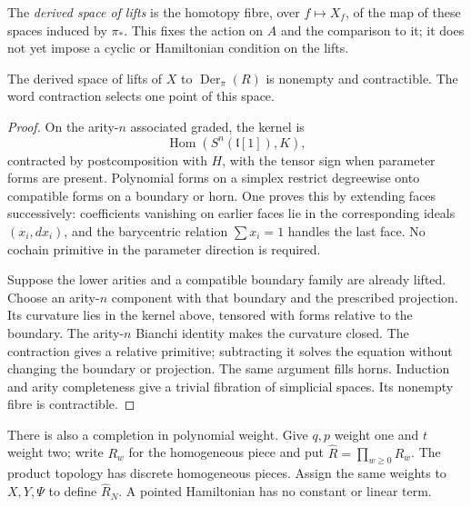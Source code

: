 The \emph{derived space of lifts} is the homotopy fibre, over
$f\mapsto X_f$, of the map of these spaces induced by $\pi_*$.
This fixes the action on $A$ and the comparison to it; it does
not yet impose a cyclic or Hamiltonian condition on the lifts.

\begin{proposition}\label{prop:vol2-hamiltonian-lift-space}
The derived space of lifts of $X$ to
$\operatorname{Der}_\pi(R)$ is nonempty and contractible.
The word contraction selects one point of this space.
\end{proposition}
\begin{proof}
On the arity-$n$ associated graded, the kernel is
\[
 \operatorname{Hom}(S^n(\mathfrak l[1]),K),
\]
contracted by postcomposition with $H$, with the tensor sign
when parameter forms are present. Polynomial forms on a simplex
restrict degreewise onto compatible forms on a boundary or horn.
One proves this by extending faces successively: coefficients
vanishing on earlier faces lie in the corresponding ideals
$(x_i,dx_i)$, and the barycentric relation $\sum x_i=1$
handles the last face. No cochain primitive in the parameter
direction is required.

Suppose the lower arities and a compatible boundary family are
already lifted. Choose an arity-$n$ component with that boundary
and the prescribed projection. Its curvature lies in the kernel
above, tensored with forms relative to the boundary. The
arity-$n$ Bianchi identity makes the curvature closed. The
contraction gives a relative primitive; subtracting it solves
the equation without changing the boundary or projection.
The same argument fills horns. Induction and arity completeness
give a trivial fibration of simplicial spaces. Its nonempty
fibre is contractible.
\end{proof}

There is also a completion in polynomial weight. Give $q,p$
weight one and $t$ weight two; write $R_w$ for the homogeneous
piece and put $\widehat R=\prod_{w\geq0}R_w$.
The product topology has discrete homogeneous pieces. Assign
the same weights to $X,Y,\Psi$ to define $\widehat R_N$.
A pointed Hamiltonian has no constant or linear term.

